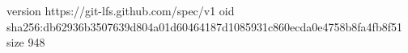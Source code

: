 version https://git-lfs.github.com/spec/v1
oid sha256:db62936b3507639d804a01d60464187d1085931c860ecda0e4758b8fa4fb8f51
size 948
